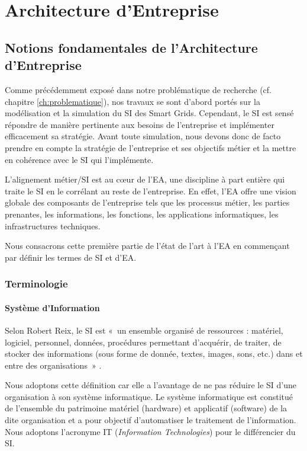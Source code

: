\chapter{Architecture d'Entreprise}
\label{ch:EA}

\section{Notions fondamentales de l'Architecture d'Entreprise}

Comme précédemment exposé dans notre problématique de recherche (cf. chapitre 
\ref{ch:problematique}), nos travaux se sont d'abord portés sur la modélisation 
et la simulation du SI des Smart Grids. Cependant, le SI est sensé répondre de 
manière pertinente aux besoins de l'entreprise et implémenter efficacement sa 
stratégie. Avant toute simulation, nous devons donc de facto prendre en compte 
la stratégie de l'entreprise et ses objectifs métier et la mettre en cohérence 
avec le SI qui l'implémente.

L'alignement métier/SI est au cœur de l'EA, une discipline à part entière qui 
traite le SI en le corrélant au reste de l'entreprise. En effet, l'EA offre une 
vision globale des composants de l'entreprise tels que les processus métier, les 
parties prenantes, les informations, les fonctions, les applications 
informatiques, les infrastructures techniques. 

Nous consacrons cette première partie de l'état de l'art à l'EA en commençant 
par définir les termes de SI et d'EA. 
 
\subsection{Terminologie}
	
\subsubsection{Système d'Information}

Selon Robert Reix, le SI est «~un ensemble organisé de ressources : matériel, 
logiciel, personnel, données, procédures permettant d'acquérir, de traiter, de 
stocker des informations (sous forme de donnée, textes, images, sons, etc.) dans 
et entre des organisations~» \cite{reix1995systemes}.

Nous adoptons cette définition car elle a l'avantage de ne pas réduire le SI 
d'une organisation à son système informatique. Le système informatique est 
constitué de l'ensemble du patrimoine matériel (hardware) et applicatif 
(software) de la dite 
organisation et a pour objectif d'automatiser le traitement de l'information. 
Nous adoptons l'acronyme IT (\textit{Information Technologies}) pour le 
différencier du SI.


